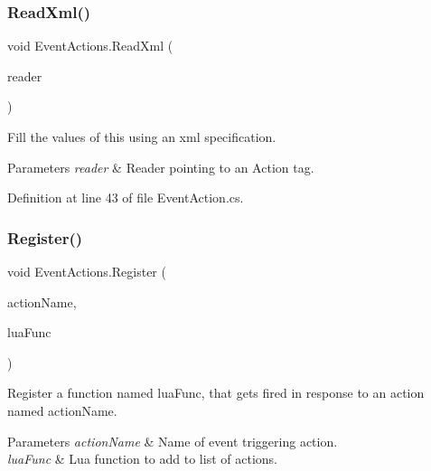 \mbox{\label{class_event_actions_a566d71637c9b0eef462b1c03c7ef8845}} 
\subsubsection{\texorpdfstring{Read\+Xml()}{ReadXml()}}
{\footnotesize\ttfamily void Event\+Actions.\+Read\+Xml (\begin{DoxyParamCaption}\item[{Xml\+Reader}]{reader }\end{DoxyParamCaption})}



Fill the values of this using an xml specification. 


\begin{DoxyParams}{Parameters}
{\em reader} & Reader pointing to an Action tag.\\
\hline
\end{DoxyParams}


Definition at line 43 of file Event\+Action.\+cs.

\mbox{\label{class_event_actions_a1a364d74c5363a6a20c50db59100472a}} 
\subsubsection{\texorpdfstring{Register()}{Register()}}
{\footnotesize\ttfamily void Event\+Actions.\+Register (\begin{DoxyParamCaption}\item[{string}]{action\+Name,  }\item[{string}]{lua\+Func }\end{DoxyParamCaption})}



Register a function named lua\+Func, that gets fired in response to an action named action\+Name. 


\begin{DoxyParams}{Parameters}
{\em action\+Name} & Name of event triggering action.\\
\hline
{\em lua\+Func} & Lua function to add to list of actions.\\
\hline
\end{DoxyParams}


